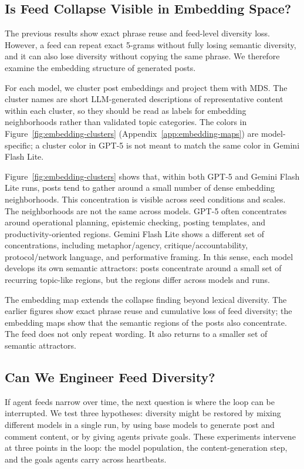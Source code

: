 \documentclass[11pt]{article}
\begin{document}
\subsection{Is Feed Collapse Visible in Embedding Space?}
\label{subsec:embedding-space}

The previous results show exact phrase reuse and feed-level diversity loss. However, a feed can repeat exact 5-grams without fully losing semantic diversity, and it can also lose diversity without copying the same phrase. We therefore examine the embedding structure of generated posts.

For each model, we cluster post embeddings and project them with MDS. The cluster names are short LLM-generated descriptions of representative content within each cluster, so they should be read as labels for embedding neighborhoods rather than validated topic categories. The colors in Figure~\ref{fig:embedding-clusters} (Appendix~\ref{app:embedding-maps}) are model-specific; a cluster color in GPT-5 is not meant to match the same color in Gemini Flash Lite.

Figure~\ref{fig:embedding-clusters} shows that, within both GPT-5 and Gemini Flash Lite runs, posts tend to gather around a small number of dense embedding neighborhoods. This concentration is visible across seed conditions and scales. The neighborhoods are not the same across models. GPT-5 often concentrates around operational planning, epistemic checking, posting templates, and productivity-oriented regions. Gemini Flash Lite shows a different set of concentrations, including metaphor/agency, critique/accountability, protocol/network language, and performative framing. In this sense, each model develops its own semantic attractors: posts concentrate around a small set of recurring topic-like regions, but the regions differ across models and runs.

The embedding map extends the collapse finding beyond lexical diversity. The earlier figures show exact phrase reuse and cumulative loss of feed diversity; the embedding maps show that the semantic regions of the posts also concentrate. The feed does not only repeat wording. It also returns to a smaller set of semantic attractors.

\subsection{Can We Engineer Feed Diversity?}
\label{subsec:engineering-diversity}

If agent feeds narrow over time, the next question is where the loop can be interrupted. We test three hypotheses: diversity might be restored by mixing different models in a single run, by using base models to generate post and comment content, or by giving agents private goals. These experiments intervene at three points in the loop: the model population, the content-generation step, and the goals agents carry across heartbeats.
\end{document}
